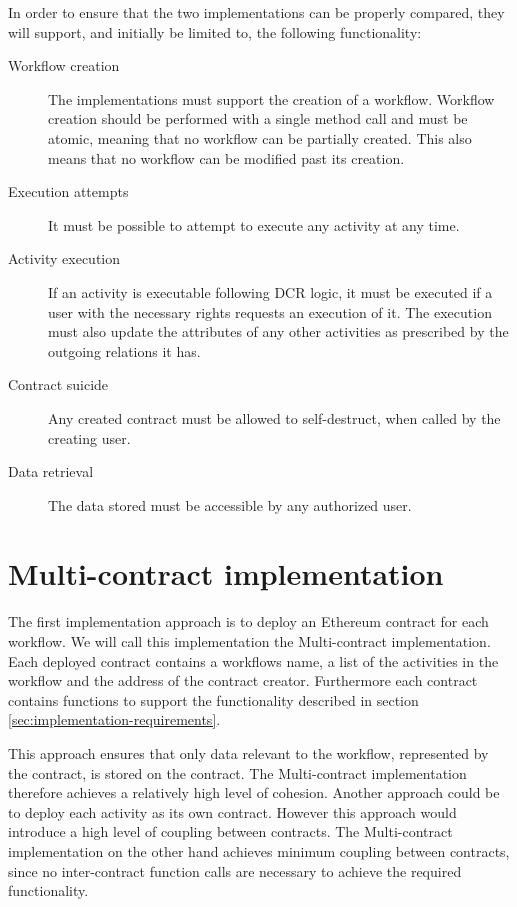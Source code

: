 \documentclass{article}
\begin{document}
	In order to ensure that the two implementations can be properly compared, they will support, and initially be limited to, the following functionality: 
	
	\begin{description}
		\item[Workflow creation] The implementations must support the creation of a workflow. Workflow creation should be performed with a single method call and must be atomic, meaning that no workflow can be partially created. This also means that no workflow can be modified past its creation.
		\item[Execution attempts] It must be possible to attempt to execute any activity at any time.
		\item[Activity execution] If an activity is executable following DCR logic, it must be executed if a user with the necessary rights requests an execution of it. The execution must also update the attributes of any other activities as prescribed by the outgoing relations it has.
		\item[Contract suicide] Any created contract must be allowed to self-destruct, when called by the creating user.
		\item[Data retrieval] The data stored must be accessible by any authorized user.
	\end{description}

	\section{Multi-contract implementation}
	The first implementation approach is to deploy an Ethereum contract for each workflow. We will call this implementation the Multi-contract implementation.
	Each deployed contract contains a workflows name, a list of the activities in the workflow and the address of the contract creator.
	Furthermore each contract contains functions to support the functionality described in section \ref{sec:implementation-requirements}.

	This approach ensures that only data relevant to the workflow, represented by the contract, is stored on the contract. The Multi-contract implementation therefore achieves a relatively high level of cohesion.
	Another approach could be to deploy each activity as its own contract.
	However this approach would introduce a high level of coupling between contracts.
	The Multi-contract implementation on the other hand achieves minimum coupling between contracts, since no inter-contract function calls are necessary to achieve the required functionality.
\end{document}
